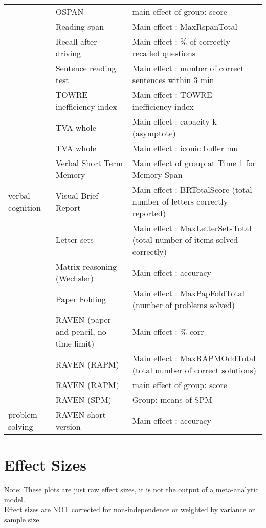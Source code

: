 \documentclass[
]{book}
\begin{document}
\begin{tabular}{l|l|l}
\cline{2-3}
 & OSPAN & main effect of group: score\\
\cline{2-3}
 & Reading span & Main effect : MaxRspanTotal\\
\cline{2-3}
 & Recall after driving & Main effect : \% of correctly recalled questions\\
\cline{2-3}
 & Sentence reading test & Main effect : number of correct sentences within 3 min\\
\cline{2-3}
 & TOWRE - inefficiency index & Main effect : TOWRE - inefficiency index\\
\cline{2-3}
 & TVA whole & Main effect : capacity k (asymptote)\\
\cline{2-3}
 & TVA whole & Main effect : iconic buffer mu\\
\cline{2-3}
 & Verbal Short Term Memory & Main effect of group at Time 1 for Memory Span\\
\cline{2-3}
\multirow[t]{-30}{*}{\raggedright\arraybackslash verbal cognition} & Visual Brief Report & Main effect : BRTotalScore (total number of letters correctly reported)\\
\cline{1-3}
 & Letter sets & Main effect : MaxLetterSetsTotal (total number of items solved correctly)\\
\cline{2-3}
 & Matrix reasoning (Wechsler) & Main effect : accuracy\\
\cline{2-3}
 & Paper Folding & Main effect : MaxPapFoldTotal (number of problems solved)\\
\cline{2-3}
 & RAVEN (paper and pencil, no time limit) & Main effect : \% corr\\
\cline{2-3}
 & RAVEN (RAPM) & Main effect : MaxRAPMOddTotal (total number of correct solutions)\\
\cline{2-3}
 & RAVEN (RAPM) & main effect of group: score\\
\cline{2-3}
 & RAVEN (SPM) & Group: means of SPM\\
\cline{2-3}
\multirow[t]{-8}{*}{\raggedright\arraybackslash problem solving} & RAVEN short version & Main effect : accuracy\\
\hline
\end{tabular}

\hypertarget{effectsizes}{%
\chapter{Effect Sizes}\label{effectsizes}}

Note: These plots are just raw effect sizes, it is not the output of a meta-analytic model.\\
Effect sizes are NOT corrected for non-independence or weighted by variance or sample size.
\end{document}
